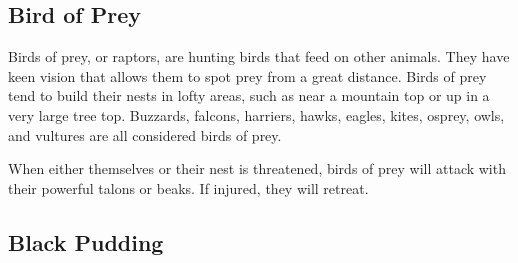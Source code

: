 \begin{multicols*}{2}
\subsection{Bird of Prey}\label{monster:Bird of Prey}

Birds of prey, or raptors, are hunting birds that feed on other animals. They have keen vision that allows them to spot prey from a great distance. Birds of prey tend to build their nests in lofty areas, such as near a mountain top or up in a very large tree top. Buzzards, falcons, harriers, hawks, eagles, kites, osprey, owls, and vultures are all considered birds of prey.

When either themselves or their nest is threatened, birds of prey will attack with their powerful talons or beaks. If injured, they will retreat.

\subsection{Black Pudding}
\end{multicols*}
